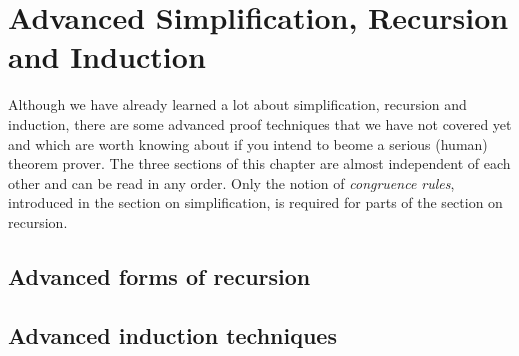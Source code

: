\chapter{Advanced Simplification, Recursion and Induction}

Although we have already learned a lot about simplification, recursion and
induction, there are some advanced proof techniques that we have not covered
yet and which are worth knowing about if you intend to beome a serious
(human) theorem prover. The three sections of this chapter are almost
independent of each other and can be read in any order. Only the notion of
\emph{congruence rules}, introduced in the section on simplification, is
required for parts of the section on recursion.



\section{Advanced forms of recursion}
\label{sec:advanced-recdef}




\section{Advanced induction techniques}
\label{sec:advanced-ind}

